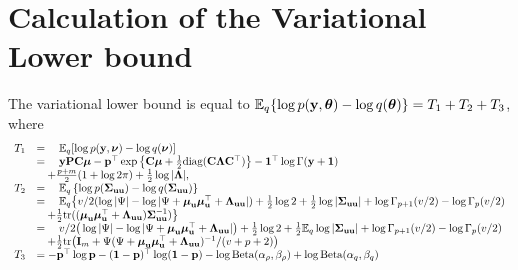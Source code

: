 \section{Calculation of the Variational Lower bound} 
		
The variational lower bound is equal to ${\mathbb E}_q\{\log{p({\bf y}, {\boldsymbol\theta})} - \log{q({\boldsymbol\theta})}\} = T_1 + T_2 + T_3$,
where
$$
\begin{array}{rl}
	T_1 & = \quad {\mathbb E}_q[\log{p({\bf y}, {\boldsymbol\nu})} - \log{q({\boldsymbol\nu})}]                                                                                                                                                  \\
	    & = \quad {\bf y} {\bf P} {\bf C} {\boldsymbol\mu} - {\bf p}^\top \exp{\left\{ {\bf C}{\boldsymbol\mu}+ \frac{1}{2} \text{diag} ({\bf C}{\boldsymbol\Lambda}{\bf C}^\top) \right\}} - {\bf 1}^\top\log \Gamma{({\bf y}+ {\bf1})}                                               \\
	    & \quad + \frac{p + m}{2} (1 + \log{2 \pi}) + \frac{1}{2} \log{|{\boldsymbol\Lambda}|},                                                                                                                                \\
	T_2 & = \quad {\mathbb E}_q \left\{ \log p({\boldsymbol \Sigma}_{{\bf u} {\bf u}}) - \log q({\boldsymbol \Sigma}_{{\bf u} {\bf u}}) \right\}                                                                                                                 \\
	    & = \quad {\mathbb E}_q \big\{ v/2(\log |\Psi| - \log |\Psi + {\boldsymbol \mu}_{\bf u} {\boldsymbol \mu}_{\bf u}^\top + {\boldsymbol \Lambda}_{{\bf u} {\bf u}}|) + \frac{1}{2} \log 2 + \frac{1}{2} \log|{\boldsymbol \Sigma}_{{\bf u} {\bf u}}| + \log \Gamma_{p+1}(v/2) - \log \Gamma_{p}(v/2)    \\
	    & \quad + \frac{1}{2} \text{tr}(({\boldsymbol \mu}_{{\bf u}} {\boldsymbol \mu}_{{\bf u}}^\top + {\boldsymbol \Lambda}_{{\bf u} {\bf u}}) {\boldsymbol \Sigma}_{{\bf u} {\bf u}}^{-1}) \big\}                                                                                                  \\
	    & = \quad v/2\big(\log |\Psi| - \log |\Psi + {\boldsymbol \mu}_{\bf u} {\boldsymbol \mu}_{\bf u}^\top + {\boldsymbol \Lambda}_{{\bf u} {\bf u}}|\big) + \frac{1}{2} \log 2 + \frac{1}{2} {\mathbb E}_q \log |{\boldsymbol \Sigma}_{{\bf u} {\bf u}}| + \log \Gamma_{p+1}(v/2) - \log \Gamma_{p}(v/2) \\
	    & \quad + \frac{1}{2} \text{tr}\big({\bf I}_m + \Psi(\Psi+ {\boldsymbol \mu}_{\bf u} {\boldsymbol \mu}_{\bf u}^\top + {\boldsymbol \Lambda}_{{\bf u} {\bf u}})^{-1}/(v + p + 2)\big)                                                                                        \\
	T_3 & = - {\bf p}^\top \log {\bf p} - ({\bf 1} - {\bf p})^\top \log ({\bf 1} - {\bf p}) - \log \text{Beta} (\alpha_\rho, \beta_\rho) + \log \text{Beta} (\alpha_q, \beta_q)                                                              
\end{array}
$$
		

